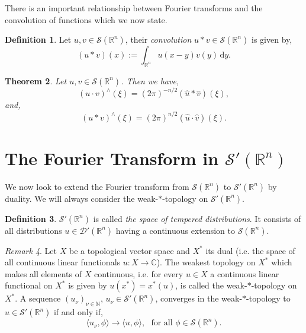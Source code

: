 \documentclass[a4paper, 12pt]{report}
\newtheorem{theorem}{Theorem}[section]
\theoremstyle{remark}
\newtheorem{remark}[theorem]{Remark}
\theoremstyle{definition}
\newtheorem{definition}[theorem]{Definition}
\begin{document}
There is an important relationship between Fourier transforms and the convolution of functions which we now state.
\begin{definition}
Let $u, v \in \mathcal{S}(\mathbb{R}^n)$, their \emph{convolution} $u\ast v \in \mathcal{S}(\mathbb{R}^n)$ is given by,
\begin{equation}
(u\ast v)(x) := \int_{\mathbb{R}^n}u(x - y)v(y)\,\mathrm{d}y.
\end{equation}
\end{definition}

\begin{theorem}
Let $u, v \in \mathcal{S}(\mathbb{R}^n)$.  Then we have,
\begin{equation}
(u\cdot v)^\wedge(\xi) = (2\pi)^{-n/2}(\hat{u}\ast\hat{v})(\xi),
\end{equation}
and,
\begin{equation}
(u\ast v)^\wedge(\xi) = (2\pi)^{n/2}(\hat{u}\cdot\hat{v})(\xi).
\end{equation}
\end{theorem}


\section{The Fourier Transform in $\mathcal{S}'(\mathbb{R}^n)$}

We now look to extend the Fourier transform from $\mathcal{S}(\mathbb{R}^n)$ to $\mathcal{S}'(\mathbb{R}^n)$ by duality.  We will always consider the weak-$\ast$-topology on $\mathcal{S}'(\mathbb{R}^n)$.
\begin{definition}
$\mathcal{S}'(\mathbb{R}^n)$ is called \emph{the space of tempered distributions}.  It consists of all distributions $u \in \mathcal{D}'(\mathbb{R}^n)$ having a continuous extension to $\mathcal{S}(\mathbb{R}^n)$.
\end{definition}
\begin{remark}
Let $X$ be a topological vector space and $X^\ast$ its dual (i.e. the space of all continuous linear functionals $u : X \to \mathbb{C}$).  The weakest topology on $X^\ast$ which makes all elements of $X$ continuous, i.e. for every $u \in X$ a continuous linear functional on $X^\ast$ is given by $u(x^\ast) = x^\ast(u)$, is called the weak-$\ast$-topology on $X^\ast$.  A sequence $(u_\nu)_{\nu \in \mathbb{N}}$, $u_\nu \in \mathcal{S}'(\mathbb{R}^n)$, converges in the weak-$\ast$-topology to $u \in \mathcal{S}'(\mathbb{R}^n)$ if and only if,
$$
\langle u_\nu, \phi\rangle \to \langle u, \phi\rangle, \,\,\,\, \text{for all } \phi \in \mathcal{S}(\mathbb{R}^n).
$$
\end{remark}
\end{document}
